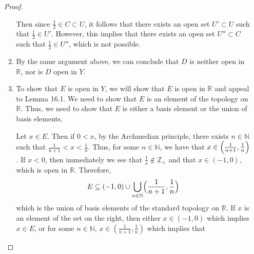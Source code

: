 \documentclass[12pt]{article}
\theoremstyle{definition}
\newcommand{\bigparen}[1]{\Bigl ( #1 \Bigr )}
\begin{document}
\begin{enumerate}
\begin{proof}
\begin{enumerate}
                            Then since $\frac{1}{2}\in C\subset U$, it follows
                            that there exists an open set $U'\subset U$
                            such that $\frac{1}{2}\in U'$. However, this
                            implies that there exists an open set $U''\subset C$
                            such that $\frac{1}{2}\in U''$, which is not
                            possible.
                        \item By the same argument above, we can conclude that
                            $D$ is neither open in $\mathbb{R}$, nor is $D$
                            open in $Y$.
                        \item To show that $E$ is open in $Y$, we will show
                            that $E$ is open in $\mathbb{R}$ and appeal to
                            Lemma 16.1. We need to show that $E$ is an element
                            of the topology on $\mathbb{R}$. Thus, we need to
                            show that $E$ is either a basis element or the
                            union of basis elements.\par\hspace{4mm} Let $x\in
                            E$. Then if $0<x$, by the Archmedian principle,
                            there exists $n\in\mathbb{N}$ such that
                            $\frac{1}{n+1}<x<\frac{1}{n}$. Thus, for some
                            $n\in\mathbb{N}$, we have that
                            $x\in\bigparen{\frac{1}{n+1}, \frac{1}{n}}$. If
                            $x<0$, then immediately we see that
                            $\frac{1}{x}\not\in\mathbb{Z}_{+}$ and that
                            $x\in(-1, 0)$, which is open in $\mathbb{R}$.
                            Therefore, 
                                \begin{equation*}
                                    E\subseteq(-1,
                                    0)\cup\bigcup_{n\in\mathbb{N}}\bigparen{\frac{1}{n+1},
                                    \frac{1}{n}}
                                \end{equation*}
                            which is the union of basis elements of the
                            standard topology on $\mathbb{R}$. If $x$ is an
                            element of the set on the right, then either
                            $x\in(-1, 0)$ which implies $x\in E$, or for some
                            $n\in\mathbb{N}$,  $x\in(\frac{1}{n+1},
                            \frac{1}{n})$ which implies that

\end{enumerate}
\end{proof}
\end{enumerate}
\end{document}
